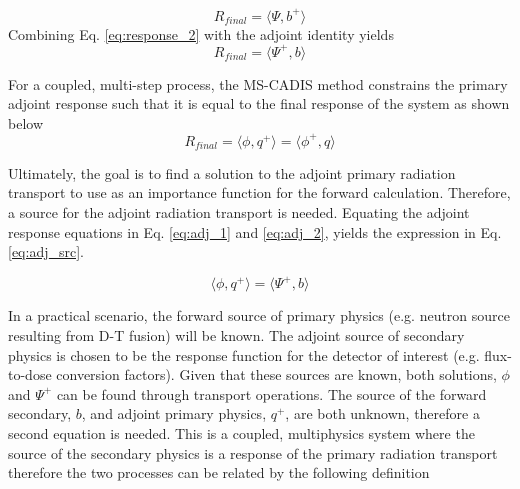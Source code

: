  \begin{equation}\label{eq:response_2}
	 R_{final} = \langle \Psi, b^{+} \rangle 
 \end{equation}
Combining Eq. \ref{eq:response_2} with the adjoint identity yields
 \begin{equation}\label{eq:adj_2}
	 R_{final} %
		=\langle \Psi^{+} , b \rangle
 \end{equation}

For a coupled, multi-step process, the MS-CADIS method 
constrains the primary adjoint response such that it is equal to  
the final response of the system
as shown below
 \begin{equation}\label{eq:adj_1}
	 R_{final} = \langle \phi, q^{+} \rangle =
		\langle \phi^{+} , q \rangle
 \end{equation}

	 
 

Ultimately, the goal is to find a solution to the adjoint
primary radiation transport to use as an importance
function for the forward calculation. Therefore, a
source for the adjoint radiation transport is needed.  Equating the adjoint
response equations in Eq. \ref{eq:adj_1} and \ref{eq:adj_2}, yields the expression in Eq.
\ref{eq:adj_src}.

 \begin{equation}\label{eq:adj_src}
	 \langle \phi, q^{+} \rangle =
	 \langle \Psi^{+}, b \rangle
 \end{equation}

In a practical scenario, the forward source of primary physics (e.g. neutron
source resulting from D-T fusion) will be known.  
The adjoint source of secondary physics is chosen to be the response function for the
detector of interest (e.g. flux-to-dose conversion factors).
Given that these sources are known, both solutions, $ \phi $ and
$\Psi^{+} $ can be found through transport operations.
The source of the forward secondary, $b$,  and adjoint primary physics,
$q^{+}$, are both unknown, therefore a second equation is needed.  
This is a coupled, multiphysics system where the source of the secondary physics is
a response of the primary radiation transport therefore the two processes can be related
by the following definition%


